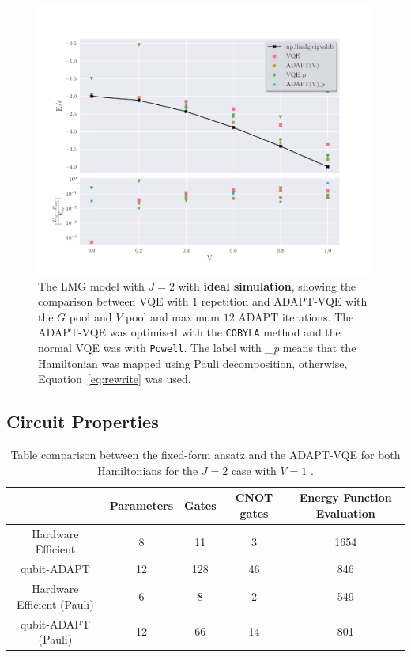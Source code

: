 \begin{figure}[ht]
    \centering
\includegraphics[width=\linewidth]{image/lipkin_result/j2main_True.pdf}
    \caption{The LMG model with $ J=2 $ with \textbf{ideal simulation}, showing the comparison between VQE with $ 1 $ repetition and ADAPT-VQE with the $ G $  pool and $ V $  pool and maximum $ 12 $ ADAPT iterations. The ADAPT-VQE was optimised with the \texttt{COBYLA} method and the normal VQE was with \texttt{Powell}. The label with \textit{\_p} means that the Hamiltonian was mapped using Pauli decomposition, otherwise, Equation~\eqref{eq:rewrite} was used.}
    \label{fig:j2main-noisy}
\end{figure}




\subsection{Circuit Properties}
\label{sub:CircuitProperties}

\begin{table}[ht]
	\centering
	\caption{Table comparison between the fixed-form ansatz and the ADAPT-VQE for both Hamiltonians for the $ J=2 $ case with $ V=1 $ .}
	\label{tab:circuit_prop}

	\begin{tabular}{c c c c c}
		\toprule
		& \textbf{Parameters} &\textbf{Gates} & \textbf{CNOT gates} & \textbf{Energy Function Evaluation} \\
		\midrule

	    Hardware Efficient & 8 & 11 & 3 & 1654\\
		qubit-ADAPT & 12 & 128 & 46 & 846 \\
		Hardware Efficient (Pauli) & 6 & 8 & 2 & 549 \\
		qubit-ADAPT (Pauli) & 12 & 66 & 14 & 801 \\
		\bottomrule
		
	\end{tabular}
\end{table}

